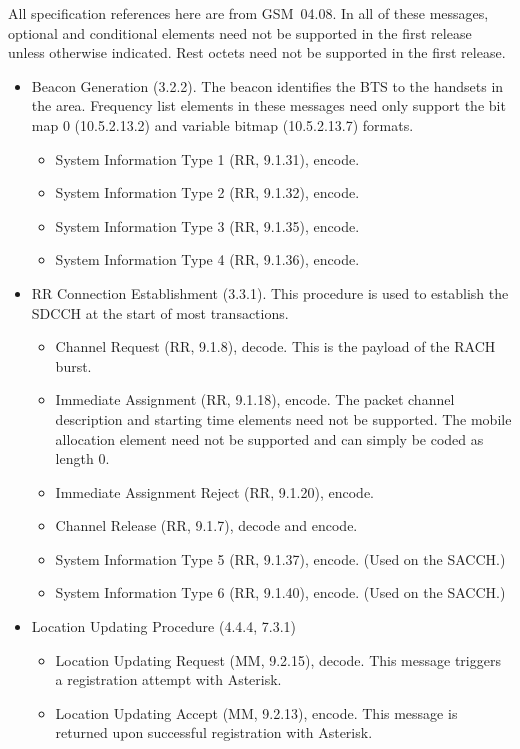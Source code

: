 \documentclass[11pt]{book}
\begin{document}
All specification references here are from GSM~04.08.  In all of these messages, optional and conditional elements need not be supported in the first release unless otherwise indicated.  Rest octets need not be supported in the first release.

\begin{itemize}
	\item Beacon Generation (3.2.2).  The beacon identifies the BTS to the handsets in the area.  Frequency list elements in these messages need only support the bit map 0 (10.5.2.13.2) and variable bitmap (10.5.2.13.7) formats.
	\begin{itemize}
		\item System Information Type 1 (RR, 9.1.31), encode.
		\item System Information Type 2 (RR, 9.1.32), encode.
		\item System Information Type 3 (RR, 9.1.35), encode.
		\item System Information Type 4 (RR, 9.1.36), encode.
	\end{itemize}
	\item RR Connection Establishment (3.3.1).  This procedure is used to establish the SDCCH at the start of most transactions.
	\begin{itemize}
		\item Channel Request (RR, 9.1.8), decode. This is the payload of the RACH burst.
		\item Immediate Assignment (RR, 9.1.18), encode.  The packet channel description and starting time elements need not be supported.  The mobile allocation element need not be supported and can simply be coded as length 0.
		\item Immediate Assignment Reject (RR, 9.1.20), encode.
		\item Channel Release (RR, 9.1.7), decode and encode.
		\item System Information Type 5 (RR, 9.1.37), encode. (Used on the SACCH.)
		\item System Information Type 6 (RR, 9.1.40), encode. (Used on the SACCH.)
	\end{itemize}
	\item Location Updating Procedure (4.4.4, 7.3.1)
	\begin{itemize}
		\item Location Updating Request (MM, 9.2.15), decode.  This message triggers a registration attempt with Asterisk.
		\item Location Updating Accept (MM, 9.2.13), encode.  This message is returned upon successful registration with Asterisk.

\end{itemize}
\end{itemize}
\end{document}
